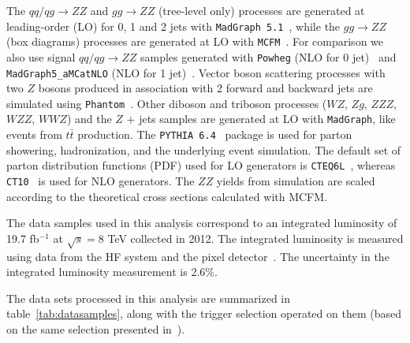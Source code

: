The $qq/qg \to ZZ$ and $gg \to ZZ$ (tree-level only) processes are generated at leading-order (LO) for 0, 1 and 2 jets with
\texttt{MadGraph 5.1}~\cite{MadGraph5.1}, while the $gg \to ZZ$ (box diagrams) processes are generated at LO with \texttt{MCFM}~\cite{MCFM}.
For comparison we also use signal $qq/qg \to ZZ$ samples generated with \texttt{Powheg} (NLO for 0 jet)~\cite{PowhegMethod, PowhegBox} and \texttt{MadGraph5\_aMCatNLO} (NLO for 1 jet)~\cite{MGatNLO}. 
Vector boson scattering processes with two $Z$ bosons produced in association with 2 forward and backward jets are simulated using \texttt{Phantom}~\cite{Phantom}. 
Other diboson and triboson processes ($WZ$, $Zg$, $ZZZ$, $WZZ$, $WWZ$) and the $Z$ + jets samples are generated at 
LO with \texttt{MadGraph}, like events from $t\bar{t}$ production. The \texttt{PYTHIA 6.4}~\cite{Sjostrand:2006za} package is used for parton showering, hadronization, and the underlying event simulation. 
The default set of parton distribution functions (PDF) used for LO generators
is \texttt{CTEQ6L}~\cite{CTEQ6L}, whereas \texttt{CT10}~\cite{CT10} is used for NLO generators. The $ZZ$ yields from simulation
are scaled according to the theoretical cross sections calculated with MCFM.

The data samples used in this analysis correspond to an integrated luminosity of 19.7 fb$^{-1}$ at $\sqrt{s}= 8$ TeV
collected in 2012. The integrated luminosity is measured using data from the HF
system and the pixel detector~\cite{CMS-PAS-LUM-13-001}. The uncertainty in the integrated luminosity measurement is
2.6\%.

The data sets processed in this analysis are summarized in table~\ref{tab:datasamples}, along with the trigger selection operated on them (based on the same selection presented in~\cite{HiggsLegacyPaper, ZZXSPaper}).


